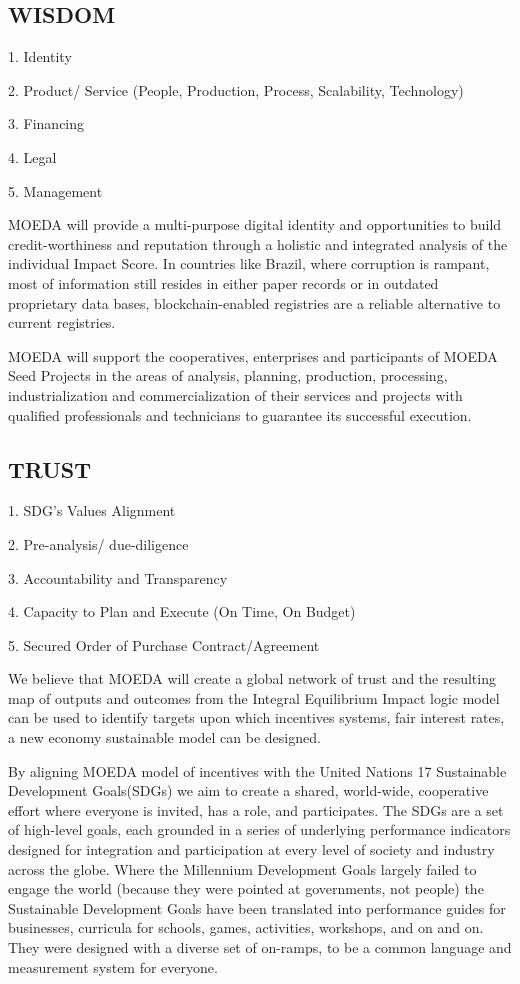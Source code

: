 \documentclass{article}
\begin{document}
\subsection {WISDOM}

1.	Identity

2.	Product/ Service (People, Production, Process, Scalability, Technology) 

3.	Financing 

4.	Legal

5.	Management 


MOEDA will provide a multi-purpose digital identity and opportunities to build credit-worthiness and reputation through a holistic and integrated analysis of the individual Impact Score.
In countries like Brazil, where corruption is rampant, most of information still resides in either paper records or in outdated proprietary data bases, blockchain-enabled registries are a reliable alternative to current registries.

MOEDA will support the cooperatives, enterprises and participants of MOEDA Seed Projects in the areas of analysis, planning, production, processing, industrialization and commercialization of their services and projects with qualified professionals and technicians to guarantee its successful execution. 

\subsection {TRUST}

1.	SDG’s Values Alignment 

2.	Pre-analysis/ due-diligence

3.	Accountability and Transparency 

4.	Capacity to Plan and Execute (On Time, On Budget)

5.	Secured Order of Purchase Contract/Agreement 

We believe that MOEDA will create a global network of trust and the resulting map of outputs and outcomes from the Integral Equilibrium Impact logic model can be used to identify targets upon which incentives systems, fair interest rates, a new economy sustainable model can be designed. 

By aligning MOEDA model of incentives with the United Nations 17 Sustainable Development Goals(SDGs) we aim to create a shared, world-wide, cooperative effort where everyone is invited, has a role, and participates. The SDGs are a set of high-level goals, each grounded in a series of underlying performance indicators designed for integration and participation at every level of society and industry across the globe. Where the Millennium Development Goals largely failed to engage the world (because they were pointed at governments, not people) the Sustainable Development Goals have been translated into performance guides for businesses, curricula for schools, games, activities, workshops, and on and on. They were designed with a diverse set of on-ramps, to be a common language and measurement system for everyone.
\end{document}
